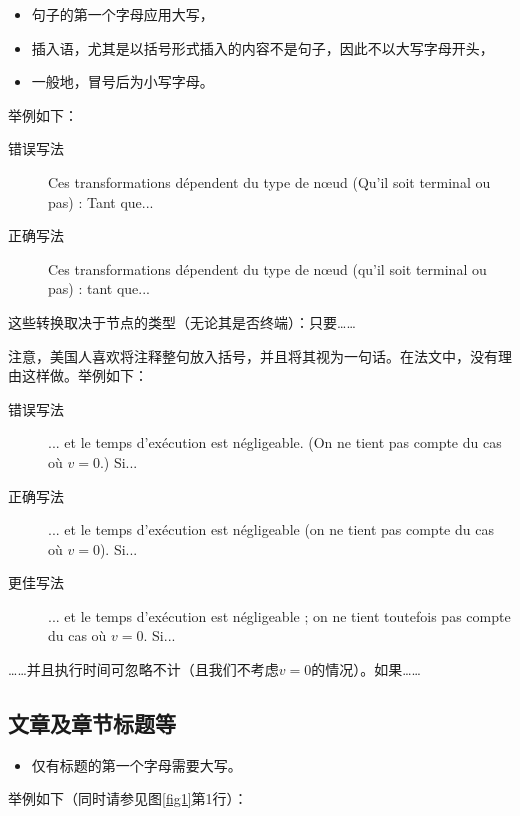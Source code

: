 \begin{itemize}
    \item 句子的第一个字母应用大写，
    \item 插入语，尤其是以括号形式插入的内容不是句子，因此不以大写字母开头，
    \item 一般地，冒号后为小写字母。
\end{itemize}

举例如下：

\begin{description}
    \item[错误写法]  Ces transformations dépendent du type de nœud (Qu'il soit terminal ou pas) : Tant que...
    \item[正确写法] Ces transformations dépendent du type de nœud (qu'il soit terminal ou pas) : tant que...
\end{description}

\begin{bil}
    这些转换取决于节点的类型（无论其是否终端）：只要……
\end{bil}

注意，美国人喜欢将注释整句放入括号，并且将其视为一句话。在法文中，没有理由这样做。举例如下：

\begin{description}
    \item[错误写法] ... et le temps d'exécution est négligeable. (On ne tient pas compte du cas où $v = 0$.) Si...
    \item[正确写法]  ... et le temps d'exécution est négligeable (on ne tient pas compte du cas où $v = 0$). Si...
    \item[更佳写法] ... et le temps d'exécution est négligeable ; on ne tient toutefois pas compte du cas où $v = 0$. Si...
\end{description}

\begin{bil}
    ……并且执行时间可忽略不计（且我们不考虑$v = 0$的情况）。如果……
\end{bil}

\subsection{文章及章节标题等}

\begin{itemize}
    \item 仅有标题的第一个字母需要大写。
\end{itemize}

举例如下（同时请参见图\ref{fig1}第1行）：


